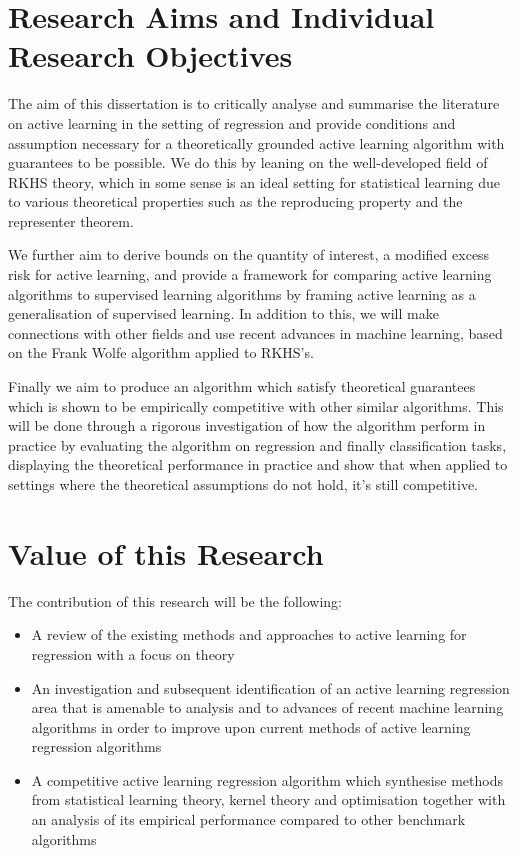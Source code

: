\section{Research Aims and Individual Research Objectives}
The aim of this dissertation is to critically analyse and summarise the
literature on active learning in the setting of regression and provide
conditions and assumption necessary for a theoretically grounded active learning
algorithm with guarantees to be possible. We do this by leaning on the
well-developed field of RKHS theory, which in some sense is an ideal setting for
statistical learning due to various theoretical properties such as the
reproducing property and the representer theorem.

We further aim to derive bounds on the quantity of interest, a modified excess
risk for active learning, and provide a framework for comparing active learning
algorithms to supervised learning algorithms by framing active learning as a
generalisation of supervised learning. In addition to this, we will make
connections with other fields and use recent advances in machine learning, based
on the Frank Wolfe algorithm applied to RKHS's.

Finally we aim to produce an algorithm which satisfy theoretical guarantees
which is shown to be empirically competitive with other similar algorithms. This
will be done through a rigorous investigation of how the algorithm perform in
practice by evaluating the algorithm on regression and finally classification
tasks, displaying the theoretical performance in practice and show that when
applied to settings where the theoretical assumptions do not hold, it's still
competitive.

\section{Value of this Research}
The contribution of this research will be the following:
\begin{itemize}
\item A review of the existing methods and approaches to active learning for
  regression with a focus on theory
\item An investigation and subsequent identification of an active learning
  regression area that is amenable to analysis and to advances of recent machine
  learning algorithms in order to improve upon current methods of active learning
  regression algorithms
\item A competitive active learning regression algorithm which synthesise methods from
  statistical learning theory, kernel theory and optimisation together with an
  analysis of its empirical performance compared to other benchmark algorithms
\end{itemize}